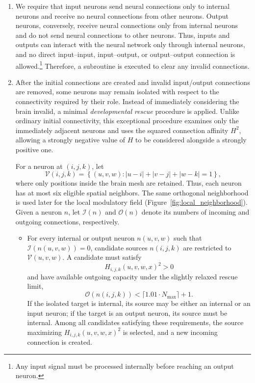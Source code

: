 \documentclass[12pt,a4paper]{article}
\begin{document}
\begin{enumerate}
	\item We require that input neurons send neural connections only to internal neurons and receive no neural connections from other neurons. Output neurons, conversely, receive neural connections only from internal neurons and do not send neural connections to other neurons. Thus, inputs and outputs can interact with the neural network only through internal neurons, and no direct input--input, input--output, or output--output connection is allowed.\footnote{Any input signal must be processed internally before reaching an output neuron.} Therefore, a subroutine is executed to clear any invalid connections. 	
	
	\item After the initial connections are created and invalid input/output connections are removed, some neurons may remain isolated with respect to the connectivity required by their role. Instead of immediately considering the brain invalid, a minimal \emph{developmental rescue} procedure is applied. Unlike ordinary initial connectivity, this exceptional procedure examines only the immediately adjacent neurons and uses the squared connection affinity $H^2$, allowing a strongly negative value of $H$ to be considered alongside a strongly positive one.

	For a neuron at $(i,j,k)$, let
	$$\mathcal{V}(i,j,k)=\left\{(u,v,w): |u-i|+|v-j|+|w-k|=1\right\},$$
	where only positions inside the brain mesh are retained. Thus, each neuron has at most six eligible spatial neighbors. The same orthogonal neighborhood is used later for the local modulatory field (Figure~\ref{fig:local_neighborhood}). Given a neuron $n$, let $\mathcal{I}(n)$ and $\mathcal{O}(n)$ denote its numbers of incoming and outgoing connections, respectively.

	\begin{itemize}
		\item For every internal or output neuron $n(u,v,w)$ such that $\mathcal{I}(n(u,v,w))=0$, candidate sources $n(i,j,k)$ are restricted to $\mathcal{V}(u,v,w)$. A candidate must satisfy
		$$H_{i,j,k}(u,v,w,x)^2>0$$
		and have available outgoing capacity under the slightly relaxed rescue limit,
		$$\mathcal{O}(n(i,j,k))<\lceil 1.01\cdot N_{\max}\rceil+1.$$
		If the isolated target is internal, its source may be either an internal or an input neuron; if the target is an output neuron, its source must be internal. Among all candidates satisfying these requirements, the source maximizing $H_{i,j,k}(u,v,w,x)^2$ is selected, and a new incoming connection is created.


\end{itemize}
\end{enumerate}
\end{document}

